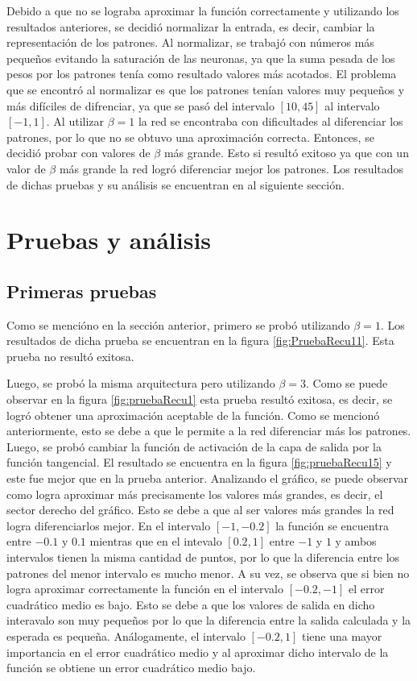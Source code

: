 \documentclass[11pt,a4paper]{article}
\begin{document}
Debido a que no se lograba aproximar la función correctamente y utilizando los resultados anteriores, se decidió normalizar la entrada, es decir, cambiar la representación de los patrones. Al normalizar, se trabajó con números más pequeños evitando la saturación de las neuronas, ya que la suma pesada de los pesos por los patrones tenía como resultado valores más acotados. El problema que se encontró al normalizar es que los patrones tenían valores muy pequeños y más difíciles de difrenciar, ya que se pasó del intervalo $[10,45]$ al intervalo $[-1,1]$. Al utilizar $\beta = 1$ la red se encontraba con dificultades al diferenciar los patrones, por lo que no se obtuvo una aproximación correcta. Entonces, se decidió probar con valores de $\beta$ más grande. Esto si resultó exitoso ya que con un valor de $\beta$ más grande la red logró diferenciar mejor los patrones. Los resultados de dichas pruebas y su análisis se encuentran en al siguiente sección.

\section{Pruebas y análisis}
\subsection{Primeras pruebas}

Como se mencióno en la sección anterior, primero se probó utilizando $\beta = 1$. Los resultados de dicha prueba se encuentran en la figura \ref{fig:PruebaRecu11}. Esta prueba no resultó exitosa.
 
Luego, se probó la misma arquitectura pero utilizando $\beta = 3$. Como se puede observar en la figura \ref{fig:pruebaRecu1} esta prueba resultó exitosa, es decir, se logró obtener una aproximación aceptable de la función. Como se mencionó anteriormente, esto se debe a que le permite  a la red diferenciar más los patrones. Luego, se probó cambiar la función de activación de la capa de salida por la función tangencial. El resultado se encuentra en la figura \ref{fig:pruebaRecu15} y este fue mejor que en la prueba anterior. Analizando el gráfico, se puede observar como logra aproximar más precisamente los valores más grandes, es decir, el sector derecho del gráfico. Esto se debe a que al ser valores más grandes la red logra diferenciarlos mejor. En el intervalo $[-1, -0.2]$ la función se encuentra entre $-0.1$ y $0.1$ mientras que en el intevalo $[0.2, 1]$ entre $-1$ y $1$ y ambos intervalos tienen la misma cantidad de puntos, por lo que la diferencia entre los patrones del menor intervalo es mucho menor. A su vez, se observa que si bien no logra aproximar correctamente la función en  el intervalo $[- 0.2, -1]$ el error cuadrático medio es bajo. Esto se debe a que los valores de salida en dicho interavalo son muy pequeños por lo que la diferencia entre la salida calculada y la esperada es pequeña. Análogamente, el intervalo $[-0.2, 1]$ tiene una mayor importancia en el error cuadrático medio y al aproximar dicho intervalo de la función se obtiene un error cuadrático medio bajo.
\end{document}
